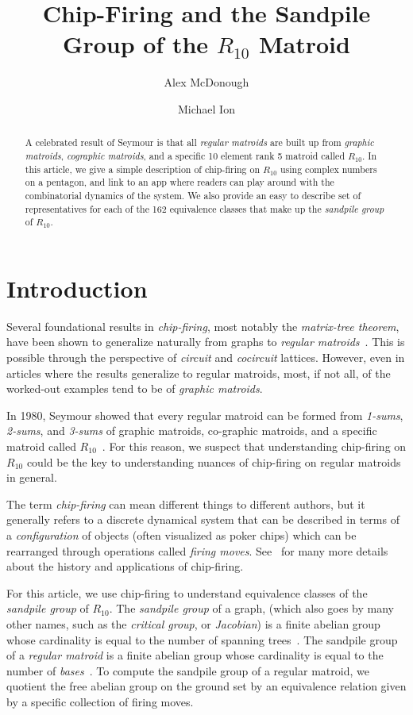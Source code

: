 \documentclass[12p]{amsart}
\title{Chip-Firing and the Sandpile Group of the $R_{10}$ Matroid}
\author{Alex McDonough}
\author{Michael Ion}
\date{}
\numberwithin{equation}{section}
\theoremstyle{plain}
\theoremstyle{definition}
\newcommand{\anote}[1]{\par 
  \framebox{\begin{minipage}[c]{0.95 \textwidth}\color{blue} ALEX'S NOTE:
      #1 \color{black}\end{minipage}}\par}
\newcommand{\mnote}[1]{\par 
  \framebox{\begin{minipage}[c]{0.95 \textwidth}\color{orange} MIKE'S NOTE:
      #1 \color{black}\end{minipage}}\par}
\begin{document}
\begin{abstract}A celebrated result of Seymour is that all \emph{regular matroids} are built up from \emph{graphic matroids}, \emph{cographic matroids}, and a specific 10 element rank 5 matroid called $R_{10}$. In this article, we give a simple description of chip-firing on $R_{10}$ using complex numbers on a pentagon, and link to an app where readers can play around with the combinatorial dynamics of the system. We also provide an easy to describe set of representatives for each of the 162 equivalence classes that make up the \emph{sandpile group} of $R_{10}$. \end{abstract}

\maketitle
\anote{We still need to link the app.}
\section{Introduction}

Several foundational results in \emph{chip-firing}, most notably the \emph{matrix-tree theorem}, have been shown to generalize naturally from graphs to \emph{regular matroids}~\cite{Merino}. This is possible through the perspective of \emph{circuit} and \emph{cocircuit} lattices. However, even in articles where the results generalize to regular matroids, most, if not all, of the worked-out examples tend to be of \emph{graphic matroids}. 

In 1980, Seymour showed that every regular matroid can be formed from \emph{1-sums}, \emph{2-sums}, and \emph{3-sums} of graphic matroids, co-graphic matroids, and a specific matroid called $R_{10}$~\cite{Seymour}. For this reason, we suspect that understanding chip-firing on $R_{10}$ could be the key to understanding nuances of chip-firing on regular matroids in general. 

The term \emph{chip-firing} can mean different things to different authors, but it generally refers to a discrete dynamical system that can be described in terms of a \emph{configuration} of objects (often visualized as poker chips) which can be rearranged through operations called \emph{firing moves}. See~\cite{Klivans} for many more details about the history and applications of chip-firing.

For this article, we use chip-firing to understand equivalence classes of the \emph{sandpile group} of $R_{10}$. The \emph{sandpile group} of a graph, (which also goes by many other names, such as the \emph{critical group}, or \emph{Jacobian}) is a finite abelian group whose cardinality is equal to the number of spanning trees~\cite{Biggs99}. The sandpile group of a \emph{regular matroid} is a finite abelian group whose cardinality is equal to the number of \emph{bases}~\cite{Merino}. To compute the sandpile group of a regular matroid, we quotient the free abelian group on the ground set by an equivalence relation given by a specific collection of firing moves. 
\end{document}
